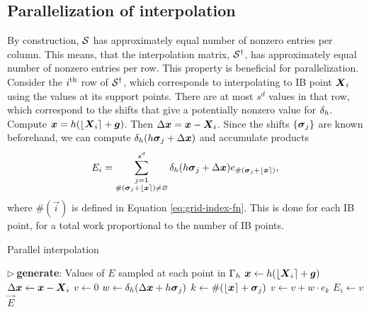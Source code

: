 \subsection{Parallelization of interpolation}

By construction, $\mathcal{S}$ has approximately equal number of nonzero entries per column.
This means, that the interpolation matrix, $\mathcal{S}^\dagger$, has approximately equal number of
nonzero entries per row. This property is beneficial for parallelization. Consider the
$i\textsuperscript{th}$ row of $\mathcal{S}^\dagger$, which corresponds to interpolating to IB point $\boldsymbol{X}_i$ using the
values at its support points. There are at most $s^d$ values in that row, which
correspond to the shifts that give a potentially nonzero value for $\delta_h$. Compute
$\boldsymbol{x}=h(\left\lfloor{\boldsymbol{X}_i}\right\rceil+\boldsymbol{g})$. Then $\Delta\boldsymbol{x}=\boldsymbol{x}-\boldsymbol{X}_i$. Since the shifts $\{\boldsymbol{\sigma}_j\}$ are
known beforehand, we can compute $\delta_h(h\boldsymbol{\sigma}_j+\Delta\boldsymbol{x})$ and accumulate products
\begin{equation*}
    E_i = \sum_{\substack{j=1\\\#(\boldsymbol{\sigma}_j+\left\lfloor{\boldsymbol{x}}\right\rceil)\neq\varnothing}}^{s^d}\delta_h(h\boldsymbol{\sigma}_j+\Delta\boldsymbol{x})e_{\#(\boldsymbol{\sigma}_j+\left\lfloor{\boldsymbol{x}}\right\rceil)},
\end{equation*}
where $\#(\vec{i})$ is defined in Equation \ref{eq:grid-index-fn}. This is done for each
IB point, for a total work proportional to the number of IB points.

\begin{algorithm}
\caption{Parallel interpolation}
\label{algo:par-interp}
\begin{algorithmic}[1]
\State $\triangleright\ $\textbf{generate}: Values of $E$ sampled at each point in $\Gamma_h$
    \State $\boldsymbol{x} \gets h(\left\lfloor{\boldsymbol{X}_i}\right\rceil+\boldsymbol{g})$
    \State $\Delta\boldsymbol{x} \gets \boldsymbol{x}-\boldsymbol{X}_i$
    \State $v \gets 0$
        \State $w \gets \delta_h(\Delta\boldsymbol{x}+h\boldsymbol{\sigma}_j)$
        \State $k \gets \#(\left\lfloor{\boldsymbol{x}}\right\rceil+\boldsymbol{\sigma}_j)$
            \State $v \gets v + w \cdot e_k$\label{line:par-interp-acc}
        \EndIf
    \EndFor
    \State $E_i \gets v$\label{line:par-interp-write}
\EndFor
\State \Return $\vec{E}$
\EndProcedure
\end{algorithmic}
\end{algorithm}

